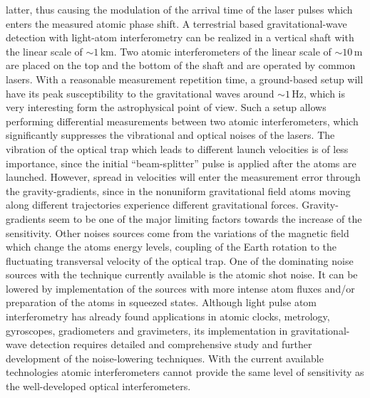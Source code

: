 latter, thus causing the modulation of the arrival time of the
laser pulses which enters the measured atomic phase shift. A
terrestrial based gravitational-wave detection with light-atom
interferometry can be realized in a vertical shaft with the linear
scale of $\sim 1\,$km. Two atomic interferometers of the linear
scale of $\sim 10\,$m are placed on the top and the bottom of the
shaft and are operated by common lasers. With a reasonable
measurement repetition time, a ground-based setup will have its peak
susceptibility to the gravitational waves around $\sim 1\,$Hz, which is
very interesting form the astrophysical point of view. Such a
setup allows performing differential measurements between two
atomic interferometers, which significantly suppresses the vibrational
and optical noises of the lasers. The vibration of the optical trap
which leads to different launch velocities is of less importance,
since the initial ``beam-splitter'' pulse is applied after the
atoms are launched. However, spread in velocities will enter the
measurement error through the gravity-gradients, since in the
nonuniform gravitational field atoms moving along different
trajectories experience different gravitational forces.
Gravity-gradients seem to be one of the major limiting factors
towards the increase of the sensitivity. Other noises sources come
from the variations of the magnetic field which change the atoms
energy levels, coupling of the Earth rotation to the fluctuating
transversal velocity of the optical trap. One of the dominating
noise sources with the technique currently available is the atomic
shot noise. It can be lowered by implementation of the sources
with more intense atom fluxes and/or preparation of the atoms in
squeezed states. Although light pulse atom interferometry has
already found applications in atomic clocks, metrology,
gyroscopes, gradiometers and gravimeters, its implementation in
gravitational-wave detection requires detailed and comprehensive
study and further development of the noise-lowering techniques.
With the current available technologies atomic interferometers
cannot provide the same level of sensitivity as the well-developed
optical interferometers. 